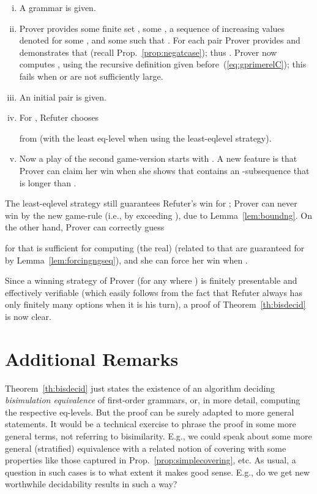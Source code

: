 \documentclass{llncs}
\begin{document}
\begin{enumerate}[i)]
	\item
		A grammar  is given.
	\item 
Prover 
provides  
some finite set ,
some , a sequence of increasing values denoted  
for some , and some  such that 
.
For each pair  Prover provides  and 
demonstrates that  (recall Prop.~\ref{prop:negatcase});
thus .
Prover now computes , using the recursive
definition given before~(\ref{eq:gprimerelC});
this fails when  or  are not sufficiently large.



\item 
An initial pair  is given.
\item
For ,
	Refuter chooses 
 
from  
(with the least eq-level when using
the least-eqlevel strategy).
\item 
Now a play of the second game-version starts with  . 
A new feature is that Prover can claim her win when she shows that 
 contains an -subsequence that is
longer than .
\end{enumerate}
The least-eqlevel strategy still guarantees
Refuter's win for ; Prover can never win by the new
game-rule (i.e., by exceeding ), due to
Lemma~\ref{lem:boundng}. On the other hand, Prover
can correctly guess 

for  that is sufficient for computing (the real)  
(related to  that are guaranteed for  by 
Lemma~\ref{lem:forcingngseq}), and she can force her win
when .


Since a winning strategy of Prover (for any  where
)
is finitely presentable and
effectively verifiable
(which easily follows from the fact that Refuter always has only
finitely many options when it is his turn),
a proof of Theorem~\ref{th:bisdecid} is now
clear.

\section{Additional Remarks}\label{sec:addrem}

Theorem~\ref{th:bisdecid} just states the existence of an algorithm
deciding \emph{bisimulation equivalence}
of first-order grammars, or, in more detail,
computing the respective eq-levels.
But the proof can be surely adapted to more general statements.
It would be a technical
exercise to phrase the proof in some more general terms, not referring
to bisimilarity. E.g., we could speak about some more general
(stratified) equivalence with a related 
notion of covering  
with some properties like those captured in 
Prop.~\ref{prop:simplecovering}, etc. 
As usual, a question in such cases is to what extent it makes good
sense. E.g., do we get new worthwhile decidability results in such a
way?
\end{document}
